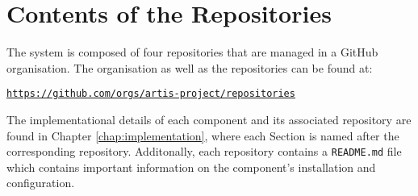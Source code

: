 \appendix

\chapter{Contents of the Repositories}
The system is composed of four repositories that are managed in a GitHub organisation. The organisation as well as the repositories can be found at:
\begin{center}
    \texttt{\href{https://github.com/orgs/artis-project/repositories}{https://github.com/orgs/artis-project/repositories}}
\end{center}

The implementational details of each component and its associated repository are found in Chapter \ref{chap:implementation}, where each Section is named after the corresponding repository. Additonally, each repository contains a \texttt{README.md} file which contains important information on the component's installation and configuration. 

